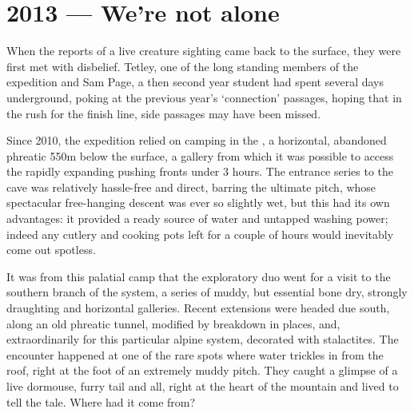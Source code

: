 \mydelimiter


\section{2013 --- We're not alone}

When the reports of a live creature sighting came back to the surface,  they were first met with disbelief. Tetley, one of the long standing members of the expedition and Sam Page, a then second year student had spent several days underground, poking at the previous year's `connection' passages, hoping that in the rush for the finish line, side passages may have been missed. 

Since 2010, the expedition relied on camping in the , a horizontal, abandoned phreatic 550m below the surface, a gallery from which it was possible to access the rapidly expanding pushing fronts under 3 hours. The entrance series to the cave was relatively hassle-free and direct, barring the ultimate pitch, whose spectacular free-hanging descent was ever so slightly wet, but this had its own advantages: it provided a ready source of water and untapped washing power; indeed any cutlery and cooking pots left for a couple of hours would inevitably come out spotless.


It was from this palatial camp that the exploratory duo went for a visit to the southern branch of the system, a series of muddy, but essential bone dry, strongly draughting and horizontal galleries. Recent extensions were headed due south, along an old phreatic tunnel, modified by breakdown in places, and, extraordinarily for this particular alpine system, decorated with stalactites. The encounter happened at one of the rare spots where water trickles in from the roof, right at the foot of an extremely muddy pitch. They caught a glimpse of a live dormouse, furry tail and all, right at the heart of the mountain and lived to tell the tale. Where had it come from? 

